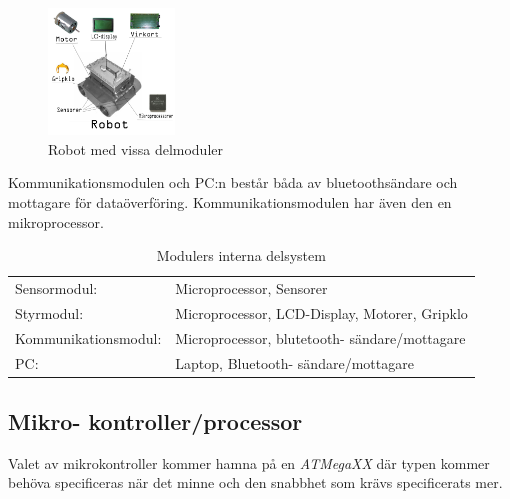\documentclass[11pt]{article}
\begin{document}
\begin{flushleft}
\begin{figure}[H]
\centering
\includegraphics[width=0.3\textwidth]{Robot_moduler}
\caption{Robot med vissa delmoduler}
\label{figure:robot}
\end{figure}

Kommunikationsmodulen och PC:n består båda av bluetoothsändare och mottagare för dataöverföring. Kommunikationsmodulen har även den en mikroprocessor.

\bigskip

\begin{table}[ht]

\centering
\begin{tabular}{l l}
Sensormodul:&
Microprocessor, Sensorer \\

Styrmodul:&
Microprocessor, LCD-Display, Motorer, Gripklo\\

Kommunikationsmodul:&
Microprocessor, blutetooth- sändare/mottagare  \\

PC:&
Laptop, Bluetooth- sändare/mottagare \\
\end{tabular}
\caption{Modulers interna delsystem}
\label{tab:Delmoduler}
\end{table}

\subsection{Mikro- kontroller/processor}
Valet av mikrokontroller kommer hamna på en \textit{ATMegaXX} där typen kommer behöva specificeras när det minne och den snabbhet som krävs specificerats mer.



\end{flushleft}
\end{document}
